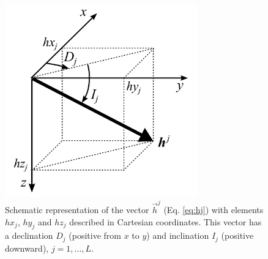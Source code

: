 \documentclass[journal abbreviation, npg]{copernicus}
\begin{document}
\begin{figure}[t]
\vspace*{2mm}
\begin{center}
\includegraphics[width=8.3cm]{Figures/Fig2.png}
\end{center}
\caption{Schematic representation of the vector $\vec{h}^{j}$ (Eq. \ref{eq:hj}) with elements $hx_{j}$, $hy_{j}$ and $hz_{j}$ described in Cartesian coordinates. This vector has a declination $D_{j}$ (positive from $x$ to $y$) and inclination $I_{j}$ (positive downward), $j = 1, ..., L$.}
\label{fig:spherical-coordinates}
\end{figure}










\end{document}
